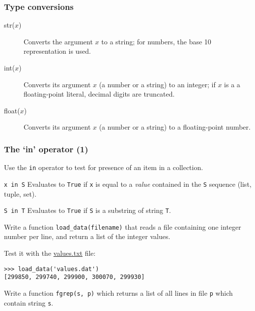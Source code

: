 \documentclass[english,serif,mathserif,xcolor=pdftex,dvipsnames,table]{beamer}
\begin{document}
\begin{frame}[fragile,label=typeconv]
  \frametitle{Type conversions}
  \begin{description}
  \item[str($x$)] Converts the argument $x$ to a string; for numbers,
    the base 10 representation is used.
  \item[int($x$)] Converts its argument $x$ (a number or a string) to an integer;
    if $x$ is a a floating-point literal, decimal digits are truncated.
  \item[float($x$)] Converts its argument $x$ (a number or a string) to a
    floating-point number.
  \end{description}
\end{frame}


\begin{frame}[fragile]
  \frametitle{The `{\ttfamily\bfseries in}' operator (1)}

  Use the \lstinline|in| operator to test for presence of an item in a
  collection.

  \begin{describe}{\lstinline|x in S|}
    Evaluates to \texttt{True} if \lstinline|x| is equal to a \emph{value}
    contained in the \lstinline|S| sequence (list, tuple, set).
  \end{describe}

  \begin{describe}{\lstinline|S in T|}
    Evaluates to \texttt{True} if \lstinline|S| is a substring of
    string \lstinline|T|.
  \end{describe}

\end{frame}


\begin{frame}[fragile]
  \begin{exercise*}[5.D]
    Write a function \lstinline|load_data(filename)| that reads a file
    containing one integer number per line, and return a list of the
    integer values.

    \+
    Test it with the
    \href{https://raw.github.com/gc3-uzh-ch/python-course/master/values.txt}{values.txt}
    file:
\begin{lstlisting}
>>> load_data('values.dat')
[299850, 299740, 299900, 300070, 299930]
\end{lstlisting}
  \end{exercise*}

  \begin{exercise*}[5.E]
    Write a function \lstinline|fgrep(s, p)| which returns a list of
    all lines in file \texttt{p} which contain string \texttt{s}.
  \end{exercise*}
\end{frame}
\end{document}
